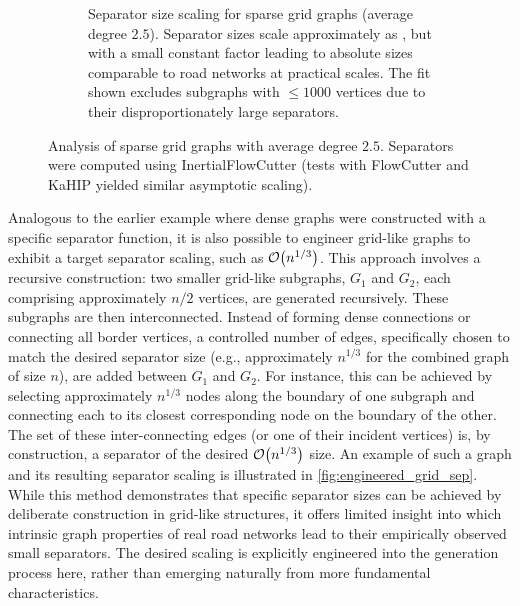 \begin{figure}[tbhp]
\begin{subfigure}{0.55\linewidth}
		\caption{Separator size scaling for sparse grid graphs (average degree \(2.5\)). Separator sizes scale approximately as , but with a small constant factor leading to absolute sizes comparable to road networks at practical scales. The fit shown excludes subgraphs with \( \le 1000 \) vertices due to their disproportionately large separators.}
		\label{fig:sparse_grid_sep_plot}
	\end{subfigure}
	\caption{Analysis of sparse grid graphs with average degree \(2.5\). Separators were computed using InertialFlowCutter (tests with FlowCutter and KaHIP yielded similar asymptotic scaling).}
	\label{fig:sparse_grid_separators}
\end{figure}


Analogous to the earlier example where dense graphs were constructed with a specific separator function, it is also possible to engineer grid-like graphs to exhibit a target separator scaling, such as \(\mathcal{O}\!\left(n^{1/3}\right)\).
This approach involves a recursive construction: two smaller grid-like subgraphs, \(G_1\) and \(G_2\), each comprising approximately \(n/2\) vertices, are generated recursively.
These subgraphs are then interconnected.
Instead of forming dense connections or connecting all border vertices, a controlled number of edges, specifically chosen to match the desired separator size (e.g., approximately \(n^{1/3}\) for the combined graph of size \(n\)), are added between \(G_1\) and \(G_2\).
For instance, this can be achieved by selecting approximately \(n^{1/3}\) nodes along the boundary of one subgraph and connecting each to its closest corresponding node on the boundary of the other.
The set of these inter-connecting edges (or one of their incident vertices) is, by construction, a separator of the desired \(\mathcal{O}\!\left(n^{1/3}\right)\) size.
An example of such a graph and its resulting separator scaling is illustrated in \cref{fig:engineered_grid_sep}.
While this method demonstrates that specific separator sizes can be achieved by deliberate construction in grid-like structures, it offers limited insight into which intrinsic graph properties of real road networks lead to their empirically observed small separators.
The desired scaling is explicitly engineered into the generation process here, rather than emerging naturally from more fundamental characteristics.

